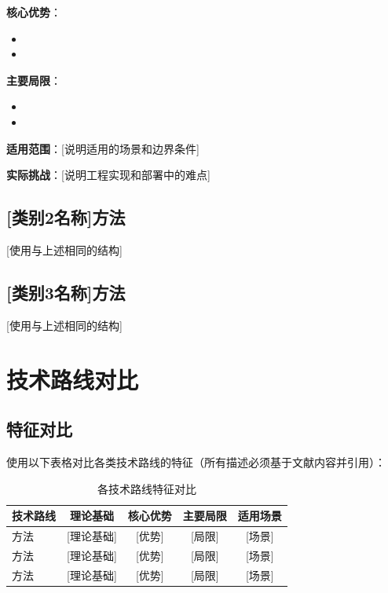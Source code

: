 \documentclass[journal]{IEEEtran}
\begin{document}
\textbf{核心优势}：
\begin{itemize}
    \item [优势1]
    \item [优势2]
\end{itemize}

\textbf{主要局限}：
\begin{itemize}
    \item [局限1]
    \item [局限2]
\end{itemize}

\textbf{适用范围}：[说明适用的场景和边界条件]

\textbf{实际挑战}：[说明工程实现和部署中的难点]

\subsection{[类别2名称]方法}
[使用与上述相同的结构]

\subsection{[类别3名称]方法}
[使用与上述相同的结构]

\section{技术路线对比}

\subsection{特征对比}
使用以下表格对比各类技术路线的特征（所有描述必须基于文献内容并引用）：

\begin{table}[htbp]
\centering
\caption{各技术路线特征对比}
\begin{tabular}{lcccc}
\toprule
技术路线 & 理论基础 & 核心优势 & 主要局限 & 适用场景 \\
\midrule
[类别1]方法 \cite{ref1,ref2} & [理论基础] & [优势] & [局限] & [场景] \\
[类别2]方法 \cite{ref3} & [理论基础] & [优势] & [局限] & [场景] \\
[类别3]方法 \cite{ref4,ref5} & [理论基础] & [优势] & [局限] & [场景] \\
\bottomrule
\end{tabular}
\end{table}
\end{document}
